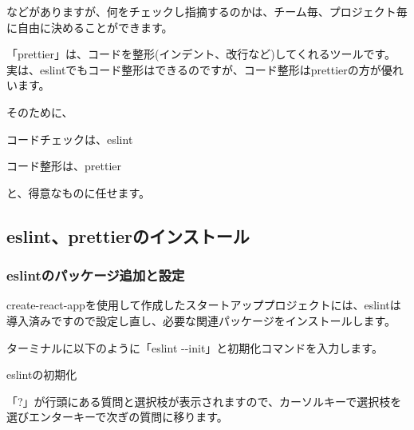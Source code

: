 \vspace*{\baselineskip}

などがありますが、何をチェックし指摘するのかは、チーム毎、プロジェクト毎に自由に決めることができます。

\vspace*{\baselineskip}

「prettier」は、コードを整形(インデント、改行など)してくれるツールです。
実は、eslintでもコード整形はできるのですが、コード整形はprettierの方が優れいます。

\vspace*{\baselineskip}

そのために、\\[0pt]

\begin{starteritemize}
\item コードチェックは、eslint
\item コード整形は、prettier
\end{starteritemize}

\vspace*{\baselineskip}

と、得意なものに任せます。

\subsection{eslint、prettierのインストール}
\keeplastskip{
  \label{sec:2-4-1}
  \label{sec-03eslint}
  \par\nobreak
}

\subsubsection*{eslintのパッケージ追加と設定}
\keeplastskip{
  \label{sec:2-4-1-1}
  \label{sec-03eslint-install}
  \par\nobreak
}

create{-}react{-}appを使用して作成したスタートアッププロジェクトには、eslintは導入済みですので設定し直し、必要な関連パッケージをインストールします。

ターミナルに以下のように「eslint {-}{-}init」と初期化コマンドを入力します。

\def\startercodeblockfontsize{}
\begin{starterterminal}[]{eslintの初期化}\end{starterterminal}

「?」が行頭にある質問と選択枝が表示されますので、カーソルキーで選択枝を選びエンターキーで次ぎの質問に移ります。

